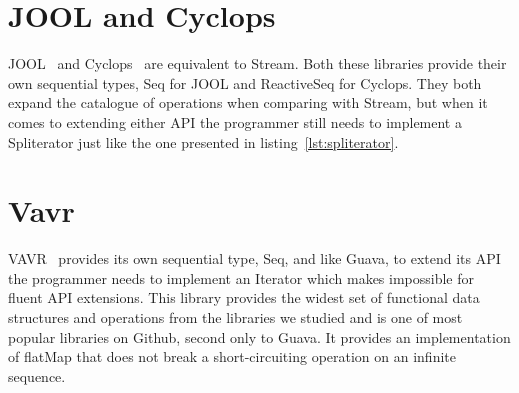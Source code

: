 \section{JOOL and Cyclops}

JOOL~\citep{jool} and Cyclops~\citep{cyclops} are equivalent to Stream. Both these libraries provide their own sequential types, Seq for JOOL and ReactiveSeq for Cyclops. They both expand the catalogue of operations when comparing with Stream, but when it comes to extending either API the programmer still needs to implement a Spliterator just like the one presented in listing~\ref{lst:spliterator}.

\section{Vavr}

VAVR~\citep{vavr} provides its own sequential type, Seq, and like Guava, to extend its API the programmer needs to implement an Iterator which makes impossible for fluent API extensions. This library provides the widest set of functional data structures and operations from the libraries we studied and is one of most popular libraries on Github, second only to Guava. It provides an implementation of flatMap that does not break a short-circuiting operation on an infinite sequence. 